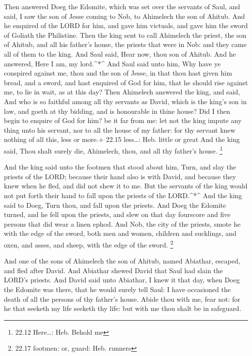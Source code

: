  Then answered Doeg the Edomite, which was set over the
servants of Saul, and said, I saw the son of Jesse coming to Nob, to
Ahimelech the son of Ahitub.  And he enquired of the LORD
for him, and gave him victuals, and gave him the sword of Goliath the
Philistine.  Then the king sent to call Ahimelech the
priest, the son of Ahitub, and all his father's house, the priests that
were in Nob: and they came all of them to the king.  And
Saul said, Hear now, thou son of Ahitub. And he answered, Here I am, my
lord.\^{}*\^{}  And Saul said unto him, Why have ye
conspired against me, thou and the son of Jesse, in that thou hast given
him bread, and a sword, and hast enquired of God for him, that he should
rise against me, to lie in wait, as at this day?  Then
Ahimelech answered the king, and said, And who is so faithful among all
thy servants as David, which is the king's son in law, and goeth at thy
bidding, and is honourable in thine house?  Did I then
begin to enquire of God for him? be it far from me: let not the king
impute any thing unto his servant, nor to all the house of my father:
for thy servant knew nothing of all this, less or more.+ 22.15
less\ldots: Heb. little or great  And the king said, Thou
shalt surely die, Ahimelech, thou, and all thy father's house.
\footnote{22.12 Here\ldots: Heb. Behold me}

 And the king said unto the footmen that stood about him,
Turn, and slay the priests of the LORD; because their hand also is with
David, and because they knew when he fled, and did not shew it to me.
But the servants of the king would not put forth their hand to fall upon
the priests of the LORD.\^{}*\^{}  And the king said to
Doeg, Turn thou, and fall upon the priests. And Doeg the Edomite turned,
and he fell upon the priests, and slew on that day fourscore and five
persons that did wear a linen ephod.  And Nob, the city of
the priests, smote he with the edge of the sword, both men and women,
children and sucklings, and oxen, and asses, and sheep, with the edge of
the sword. \footnote{22.17 footmen: or, guard: Heb. runners}

 And one of the sons of Ahimelech the son of Ahitub, named
Abiathar, escaped, and fled after David.  And Abiathar
shewed David that Saul had slain the LORD's priests.  And
David said unto Abiathar, I knew it that day, when Doeg the Edomite was
there, that he would surely tell Saul: I have occasioned the death of
all the persons of thy father's house.  Abide thou with me,
fear not: for he that seeketh my life seeketh thy life: but with me thou
shalt be in safeguard.

